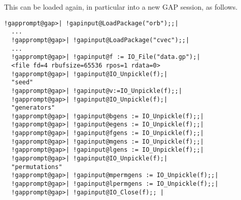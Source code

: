 \documentclass[a4paper,11pt]{report}
\begin{document}
{{ This can be loaded again, in particular into a new \textsf{GAP} session, as follows. 
\begin{Verbatim}[commandchars=!@|,fontsize=\small,frame=single,label=Example]
  !gapprompt@gap>| !gapinput@LoadPackage("orb");;|
  ...
  !gapprompt@gap>| !gapinput@LoadPackage("cvec");;|
  ...
  !gapprompt@gap>| !gapinput@f := IO_File("data.gp");|
  <file fd=4 rbufsize=65536 rpos=1 rdata=0>
  !gapprompt@gap>| !gapinput@IO_Unpickle(f);|
  "seed"
  !gapprompt@gap>| !gapinput@v:=IO_Unpickle(f);;|
  !gapprompt@gap>| !gapinput@IO_Unpickle(f);|
  "generators"
  !gapprompt@gap>| !gapinput@bgens := IO_Unpickle(f);;|
  !gapprompt@gap>| !gapinput@egens := IO_Unpickle(f);;|
  !gapprompt@gap>| !gapinput@fgens := IO_Unpickle(f);;|
  !gapprompt@gap>| !gapinput@mgens := IO_Unpickle(f);;|
  !gapprompt@gap>| !gapinput@lgens := IO_Unpickle(f);;|
  !gapprompt@gap>| !gapinput@IO_Unpickle(f);|
  "permutations"
  !gapprompt@gap>| !gapinput@mpermgens := IO_Unpickle(f);;|
  !gapprompt@gap>| !gapinput@lpermgens := IO_Unpickle(f);;|
  !gapprompt@gap>| !gapinput@IO_Close(f);; |
\end{Verbatim}
 

}}
\end{document}
